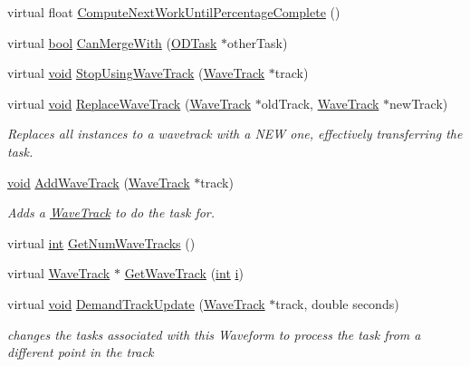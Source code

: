 \begin{DoxyCompactItemize}
\item 
virtual float \hyperlink{class_o_d_task_a092be4b67467f5b5e717861bbc0b5e89}{Compute\+Next\+Work\+Until\+Percentage\+Complete} ()
\item 
virtual \hyperlink{mac_2config_2i386_2lib-src_2libsoxr_2soxr-config_8h_abb452686968e48b67397da5f97445f5b}{bool} \hyperlink{class_o_d_task_a491d4a2787367322422f78433dd33e8e}{Can\+Merge\+With} (\hyperlink{class_o_d_task}{O\+D\+Task} $\ast$other\+Task)
\item 
virtual \hyperlink{sound_8c_ae35f5844602719cf66324f4de2a658b3}{void} \hyperlink{class_o_d_task_a3ac4c171329ece3638adc06285e34b5c}{Stop\+Using\+Wave\+Track} (\hyperlink{class_wave_track}{Wave\+Track} $\ast$track)
\item 
virtual \hyperlink{sound_8c_ae35f5844602719cf66324f4de2a658b3}{void} \hyperlink{class_o_d_task_ad1517b5142eebf42ff5155fb17e4ffbe}{Replace\+Wave\+Track} (\hyperlink{class_wave_track}{Wave\+Track} $\ast$old\+Track, \hyperlink{class_wave_track}{Wave\+Track} $\ast$new\+Track)
\begin{DoxyCompactList}\small\item\em Replaces all instances to a wavetrack with a N\+EW one, effectively transferring the task. \end{DoxyCompactList}\item 
\hyperlink{sound_8c_ae35f5844602719cf66324f4de2a658b3}{void} \hyperlink{class_o_d_task_a3438e8f3f97a2ad2954913b23beaa0a6}{Add\+Wave\+Track} (\hyperlink{class_wave_track}{Wave\+Track} $\ast$track)
\begin{DoxyCompactList}\small\item\em Adds a \hyperlink{class_wave_track}{Wave\+Track} to do the task for. \end{DoxyCompactList}\item 
virtual \hyperlink{xmltok_8h_a5a0d4a5641ce434f1d23533f2b2e6653}{int} \hyperlink{class_o_d_task_afaadfdc39a36023fdf2d434240a71f92}{Get\+Num\+Wave\+Tracks} ()
\item 
virtual \hyperlink{class_wave_track}{Wave\+Track} $\ast$ \hyperlink{class_o_d_task_a33106da71ce2e3e6c2124c38e211efd9}{Get\+Wave\+Track} (\hyperlink{xmltok_8h_a5a0d4a5641ce434f1d23533f2b2e6653}{int} \hyperlink{checksum_8c_ab80e330a3bc9e38c1297fe17381e92b4}{i})
\item 
virtual \hyperlink{sound_8c_ae35f5844602719cf66324f4de2a658b3}{void} \hyperlink{class_o_d_task_a6dfeaa8283bb419c3584dd77f642d0d2}{Demand\+Track\+Update} (\hyperlink{class_wave_track}{Wave\+Track} $\ast$track, double seconds)
\begin{DoxyCompactList}\small\item\em changes the tasks associated with this Waveform to process the task from a different point in the track \end{DoxyCompactList}\item 

\end{DoxyCompactItemize}
